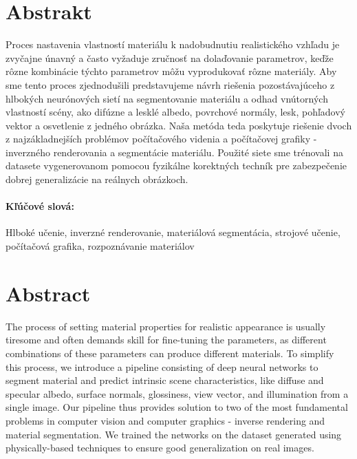 \documentclass[12pt, twoside]{book}
\begin{document}

\newpage 
\section*{Abstrakt}

Proces nastavenia vlastností materiálu k nadobudnutiu realistického vzhľadu je zvyčajne únavný a často vyžaduje zručnosť na dolaďovanie parametrov, keďže rôzne kombinácie týchto parametrov môžu vyprodukovať rôzne materiály. Aby sme tento proces zjednodušili predstavujeme návrh riešenia pozostávajúceho z hlbokých neurónových sietí na \; \; \; segmentovanie materiálu a odhad vnútorných vlastností scény, ako difúzne a lesklé albedo, povrchové normály, lesk, pohľadový vektor a osvetlenie z jedného obrázka. Naša metóda teda poskytuje riešenie dvoch z najzákladnejších problémov počítačového videnia a počítačovej grafiky - inverzného renderovania a segmentácie materiálu. Použité siete sme trénovali na datasete vygenerovanom pomocou fyzikálne korektných techník pre zabezpečenie dobrej generalizácie na reálnych obrázkoch.

\paragraph*{Kľúčové slová:} Hlboké učenie, inverzné renderovanie, materiálová segmentácia, strojové učenie, počítačová grafika, rozpoznávanie materiálov


\newpage 
\section*{Abstract}
The process of setting material properties for realistic appearance is usually tiresome and often demands skill for fine-tuning the parameters, as different combinations of these parameters can produce different materials. To simplify this process, we introduce a pipeline consisting of deep neural networks to segment material and predict intrinsic scene characteristics, like diffuse and specular albedo, surface normals, glossiness, view vector, and illumination from a single image. Our pipeline thus provides solution to two of the most fundamental problems in computer vision and computer graphics - inverse rendering and material segmentation. We trained the networks on the dataset generated using physically-based techniques to ensure good generalization on real images.
\end{document}
